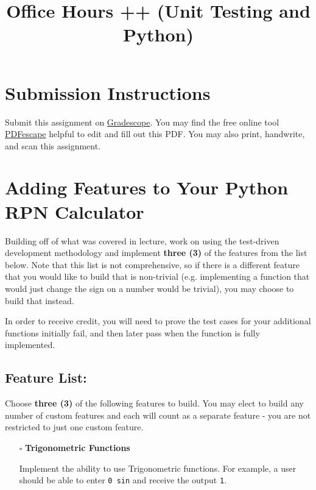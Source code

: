 \documentclass{article}
\begin{document}
\fancyfoot[C]{\color{gray} \thepage~/~\pageref*{LastPage}}
\pagestyle{fancyplain}

\title{\textbf{Office Hours ++ (Unit Testing and Python)\\}}
\author{\textbf{\color{red}{Due: Saturday, February 24th, 11:59PM (Hard Deadline)}}}
\date{}
\maketitle


\section*{Submission Instructions}
Submit this assignment on \href{https://gradescope.com/courses/13649}{Gradescope}.
You may find the free online tool \href{https://www.pdfescape.com}{PDFescape}
helpful to edit and fill out this PDF.
You may also print, handwrite, and scan this assignment.

\section*{Adding Features to Your Python RPN Calculator}

Building off of what was covered in lecture, work on using the test-driven development methodology and implement \textbf{three (3)} of the features from the list below. Note that this list is not comprehensive, so if there is a different feature that you would like to build that is non-trivial (e.g. implementing a function that would just change the sign on a number would be trivial), you may choose to build that instead.

In order to receive credit, you will need to prove the test cases for your additional functions initially fail, and then later pass when the function is fully implemented.

\subsection*{Feature List:}
Choose \textbf{three (3)} of the following features to build. You may elect to build any number of custom features and each will count as a separate feature - you are not restricted to just one custom feature.
\begin{itemize}
  \item[$\square$] \textbf{Trigonometric Functions}
  
Implement the ability to use Trigonometric functions. For example, a user should be able to enter \texttt{0 sin} and receive the output \texttt{1}.\newline
\end{itemize}
\end{document}
